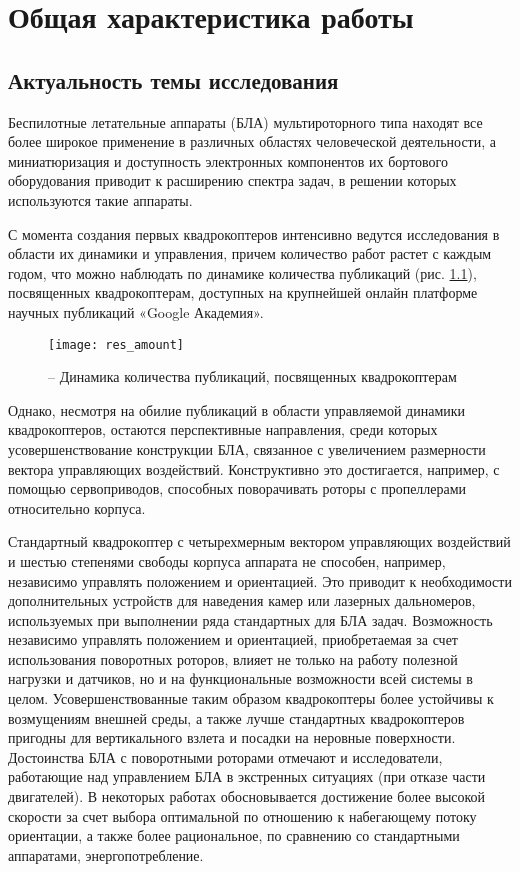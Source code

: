 
\chapter{Общая характеристика работы}

\section{Актуальность темы исследования}

Беспилотные летательные аппараты (БЛА) мультироторного типа находят все более широкое применение в различных областях человеческой деятельности, а миниатюризация и доступность электронных компонентов их бортового оборудования приводит к расширению спектра задач, в решении которых используются такие аппараты.

С момента создания первых квадрокоптеров интенсивно ведутся исследования в области их динамики и управления, причем количество работ растет с каждым годом, что можно наблюдать по динамике количества публикаций (рис. \ref{pic:res_amount}), посвященных квадрокоптерам, доступных на крупнейшей онлайн платформе научных публикаций «Google Академия».

\begin{figure}[h!]
	\centering
	\texttt{[image: res\_amount]}
	\caption{ -- Динамика количества публикаций, посвященных квадрокоптерам}
	\label{pic:res_amount}
\end{figure}

Однако, несмотря на обилие публикаций в области управляемой динамики квадрокоптеров, остаются перспективные направления, среди которых усовершенствование конструкции БЛА, связанное с увеличением размерности вектора управляющих воздействий.
Конструктивно это достигается, например, с помощью сервоприводов, способных поворачивать роторы с пропеллерами относительно корпуса.

Стандартный квадрокоптер с четырехмерным вектором управляющих воздействий и шестью степенями свободы корпуса аппарата не способен, например, независимо управлять положением и ориентацией.
Это приводит к необходимости дополнительных устройств для наведения камер или лазерных дальномеров, используемых при выполнении ряда стандартных для БЛА задач.
Возможность независимо управлять положением и ориентацией, приобретаемая за счет использования поворотных роторов, влияет не только на работу полезной нагрузки и датчиков, но и на функциональные возможности всей системы в целом.
Усовершенствованные таким образом квадрокоптеры более устойчивы к возмущениям внешней среды, а также лучше стандартных квадрокоптеров пригодны для вертикального взлета и посадки на неровные поверхности.
Достоинства БЛА с поворотными роторами отмечают и исследователи, работающие над управлением БЛА в экстренных ситуациях (при отказе части двигателей).
В некоторых работах обосновывается достижение более высокой скорости за счет выбора оптимальной по отношению к набегающему потоку ориентации, а также более рациональное, по сравнению со стандартными аппаратами, энергопотребление.

